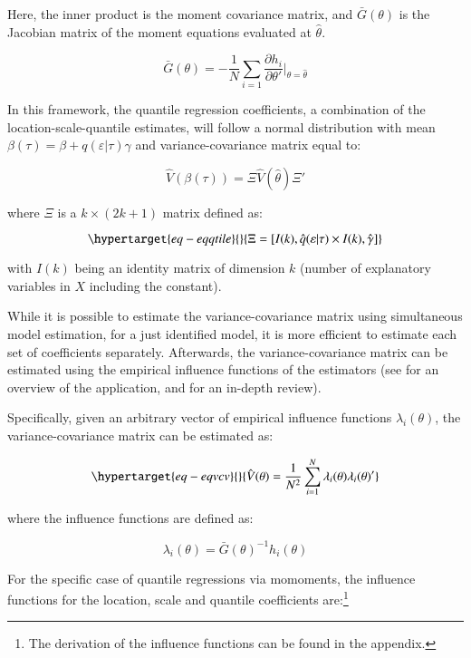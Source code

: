 \documentclass[
  authoryear,
  review,
  1p]{elsarticle}
\begin{document}
Here, the inner product is the moment covariance matrix, and
\(\bar{G}(\theta)\) is the Jacobian matrix of the moment equations
evaluated at \(\hat\theta\).

\[\bar{G}(\theta) =-\frac{1}{N} \sum_{i=1} \frac{\partial h_i}{\partial \theta'} \Big|_{\theta=\hat\theta}\]

In this framework, the quantile regression coefficients, a combination
of the location-scale-quantile estimates, will follow a normal
distribution with mean \(\beta(\tau) = \beta+q(\varepsilon|\tau)\gamma\)
and variance-covariance matrix equal to:

\[\hat{V}(\beta(\tau)) = \Xi \hat{V}(\hat\theta) \Xi'
\]

where \(\Xi\) is a \(k \times (2k+1)\) matrix defined as:

\begin{equation}\protect\hypertarget{eq-eqqtile}{}{\Xi = [ I(k), \hat q(\varepsilon|\tau) \times I(k), \hat \gamma ]
}\label{eq-eqqtile}\end{equation}

with \(I(k)\) being an identity matrix of dimension \(k\) (number of
explanatory variables in \(X\) including the constant).

While it is possible to estimate the variance-covariance matrix using
simultaneous model estimation, for a just identified model, it is more
efficient to estimate each set of coefficients separately. Afterwards,
the variance-covariance matrix can be estimated using the empirical
influence functions of the estimators (see \citet{jann_2020} for an
overview of the application, and \citet{hampel2005} for an in-depth
review).

Specifically, given an arbitrary vector of empirical influence functions
\(\lambda_i(\theta)\), the variance-covariance matrix can be estimated
as:

\begin{equation}\protect\hypertarget{eq-eqvcv}{}{\hat{V}(\theta) = \frac{1}{N^2} \sum_{i=1}^N \lambda_i(\theta) \lambda_i(\theta)'
}\label{eq-eqvcv}\end{equation}

where the influence functions are defined as:

\[\lambda_i(\theta) = \bar G(\theta)^{-1} h_i(\theta)\]

For the specific case of quantile regressions via momoments, the
influence functions for the location, scale and quantile coefficients
are:\footnote{The derivation of the influence functions can be found in
  the appendix.}
\end{document}
